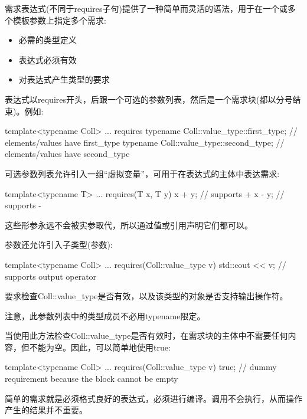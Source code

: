 

需求表达式(不同于requires子句)提供了一种简单而灵活的语法，用于在一个或多个模板参数上指定多个需求:

\begin{itemize}
\item
必需的类型定义

\item
表达式必须有效

\item
对表达式产生类型的要求
\end{itemize}

表达式以requires开头，后跟一个可选的参数列表，然后是一个需求块(都以分号结束)。例如:

\begin{cpp}
template<typename Coll>
... requires {
		typename Coll::value_type::first_type; // elements/values have first_type
		typename Coll::value_type::second_type; // elements/values have second_type
	}
\end{cpp}

可选参数列表允许引入一组“虚拟变量”，可用于在表达式的主体中表达需求:

\begin{cpp}
template<typename T>
... requires(T x, T y) {
		x + y; // supports +
		x - y; // supports -
	}
\end{cpp}

这些形参永远不会被实参取代，所以通过值或引用声明它们都可以。

参数还允许引入子类型(参数):

\begin{cpp}
template<typename Coll>
... requires(Coll::value_type v) {
		std::cout << v; // supports output operator
	}
\end{cpp}

要求检查Coll::value\_type是否有效，以及该类型的对象是否支持输出操作符。

注意，此参数列表中的类型成员不必用typename限定。

当使用此方法检查Coll::value\_type是否有效时，在需求块的主体中不需要任何内容，但不能为空。因此，可以简单地使用true:

\begin{cpp}
template<typename Coll>
... requires(Coll::value_type v) {
		true; // dummy requirement because the block cannot be empty
	}
\end{cpp}


简单的需求就是必须格式良好的表达式，必须进行编译。调用不会执行，从而操作产生的结果并不重要。

